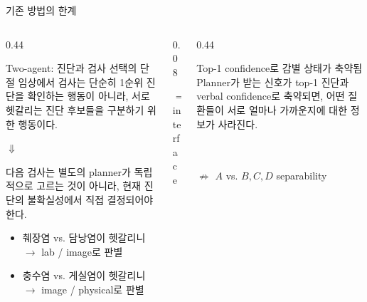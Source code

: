 \documentclass[
11pt,notheorems,hyperref={pdfauthor=whatever}
]{beamer}
\begin{document}
\begin{frame}{기존 방법의 한계}
\vspace{0.15em}
\begin{columns}[T,onlytextwidth]
\begin{column}{0.44\textwidth}
\begin{block}{Two-agent: 진단과 검사 선택의 단절}
\small
임상에서 검사는 단순히 1순위 진단을 확인하는 행동이 아니라, 서로 헷갈리는 진단 후보들을 구분하기 위한 행동이다.

\vspace{0.1em}
\begin{center}
\textcolor{DeepBlue}{\(\Downarrow\)}
\end{center}
\vspace{-0.2em}
다음 검사는 별도의 planner가 독립적으로 고르는 것이 아니라, 현재 진단의 불확실성에서 직접 결정되어야 한다.

\vspace{0.25em}
\scriptsize
\begin{itemize}
  \item 췌장염 vs. 담낭염이 헷갈리니 \(\rightarrow\) lab / image로 판별
  \item 충수염 vs. 게실염이 헷갈리니 \(\rightarrow\) image / physical로 판별
\end{itemize}
\end{block}
\end{column}

\begin{column}{0.08\textwidth}
\vspace{3.3em}
\begin{center}
{\Large\textcolor{DeepBlue}{\(\Longrightarrow\)}}\\[-0.1em]
{\tiny\textcolor{DeepBlue}{interface}}
\end{center}
\end{column}

\begin{column}{0.44\textwidth}
\begin{block}{Top-1 confidence로 감별 상태가 축약됨}
\small
Planner가 받는 신호가 top-1 진단과 verbal confidence로 축약되면, 어떤 질환들이 서로 얼마나 가까운지에 대한 정보가 사라진다.

\vspace{0.35em}
\centering
{}\\[0.2em]
\\[0.35em]
\(\not\Rightarrow\) \(A\) vs. \(B,C,D\) separability
\end{block}
\end{column}
\end{columns}


\end{frame}
\end{document}
